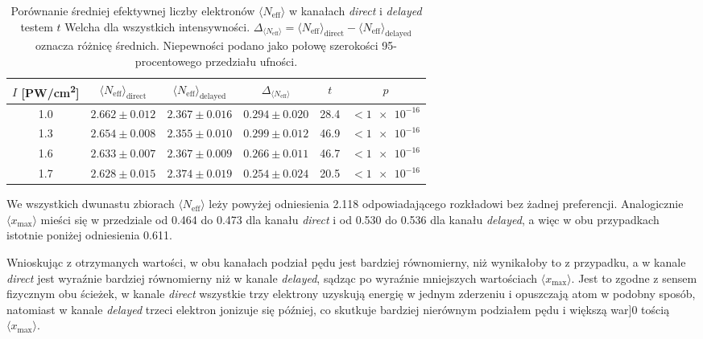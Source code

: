 \documentclass[12pt,a4paper]{article}
\newcommand{\Neff}{N_{\mathrm{eff}}}
\newcommand{\xmax}{x_{\max}}
\newcommand{\PWcm}{PW/cm\textsuperscript{2}}
\begin{document}
\begin{table}[htbp]
  \centering
  \caption{Porównanie średniej efektywnej liczby elektronów
  $\langle\Neff\rangle$ w kanałach \emph{direct} i \emph{delayed}
  testem $t$ Welcha dla wszystkich intensywności.
  $\Delta_{\langle\Neff\rangle}=\langle\Neff\rangle_{\mathrm{direct}}-\langle\Neff\rangle_{\mathrm{delayed}}$
  oznacza różnicę średnich. Niepewności podano jako połowę szerokości 95-procentowego
  przedziału ufności.}
  \label{tab:welch_neff}
  \begin{tabular}{cccccc}
    \toprule
    $I$ [\PWcm] & $\langle\Neff\rangle_{\mathrm{direct}}$
      & $\langle\Neff\rangle_{\mathrm{delayed}}$
      & $\Delta_{\langle\Neff\rangle}$ & $t$ & $p$ \\
    \midrule
    \num{1.0} & $\num{2.662}\pm\num{0.012}$ & $\num{2.367}\pm\num{0.016}$ & $\num{0.294}\pm\num{0.020}$ & \num{28.4} & $<\num{1e-16}$ \\
    \num{1.3} & $\num{2.654}\pm\num{0.008}$ & $\num{2.355}\pm\num{0.010}$ & $\num{0.299}\pm\num{0.012}$ & \num{46.9} & $<\num{1e-16}$ \\
    \num{1.6} & $\num{2.633}\pm\num{0.007}$ & $\num{2.367}\pm\num{0.009}$ & $\num{0.266}\pm\num{0.011}$ & \num{46.7} & $<\num{1e-16}$ \\
    \num{1.7} & $\num{2.628}\pm\num{0.015}$ & $\num{2.374}\pm\num{0.019}$ & $\num{0.254}\pm\num{0.024}$ & \num{20.5} & $<\num{1e-16}$ \\
    \bottomrule
  \end{tabular}
\end{table}

We wszystkich dwunastu zbiorach $\langle\Neff\rangle$ leży powyżej
odniesienia \num{2.118} odpowiadającego rozkładowi bez żadnej
preferencji. Analogicznie $\langle\xmax\rangle$ mieści się w przedziale
od \num{0.464} do \num{0.473} dla kanału \emph{direct} i od \num{0.530}
do \num{0.536} dla kanału \emph{delayed}, a więc w obu przypadkach
istotnie poniżej odniesienia \num{0.611}.


Wnioskując z otrzymanych wartości, w obu kanałach podział pędu jest bardziej równomierny, niż wynikałoby to z przypadku, a w kanale
\emph{direct} jest wyraźnie bardziej równomierny niż w kanale
\emph{delayed}, sądząc po wyraźnie mniejszych wartościach $\langle\xmax\rangle$. Jest to zgodne z sensem fizycznym obu ścieżek, w kanale
\emph{direct} wszystkie trzy elektrony uzyskują energię w jednym
zderzeniu i opuszczają atom w podobny sposób, natomiast w kanale
\emph{delayed} trzeci elektron jonizuje się później, co skutkuje bardziej nierównym podziałem pędu i większą war]0
tością $\langle\xmax\rangle$.
\end{document}
